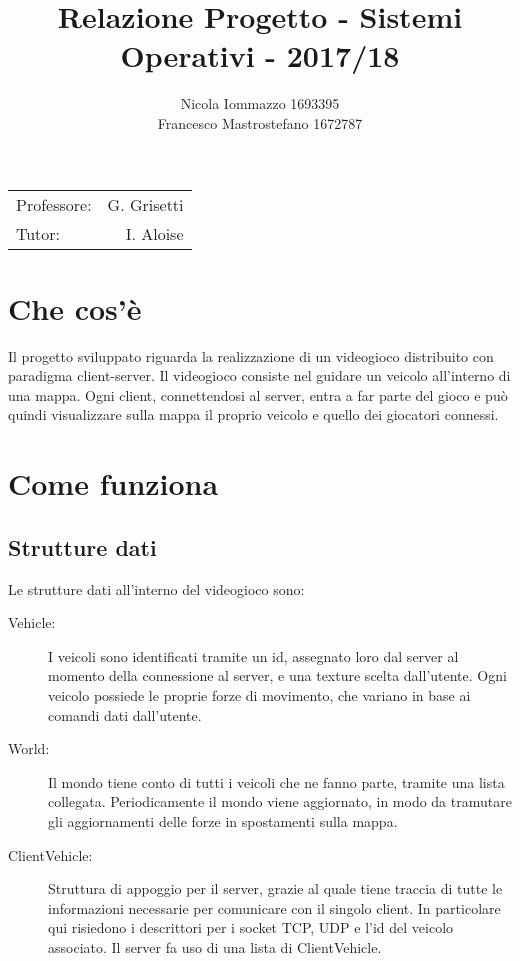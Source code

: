\documentclass{article}
\title{Relazione Progetto - Sistemi Operativi - 2017/18} %
\author{Nicola Iommazzo 1693395 \\ Francesco Mastrostefano 1672787} %
\date{}
\begin{document}
\maketitle %

\begin{center}
\begin{tabular}{l r}
Professore: & G. Grisetti \\		%
Tutor: & I. Aloise \\			
\end{tabular}
\end{center}

\section*{Che cos'è}
Il progetto sviluppato riguarda la realizzazione di un videogioco distribuito con paradigma client-server.
Il videogioco consiste nel guidare un veicolo all'interno di una mappa. Ogni client, connettendosi al server, entra a far parte del gioco e può quindi visualizzare sulla mappa il proprio veicolo e quello dei giocatori connessi.

\section*{Come funziona}

\subsection*{Strutture dati}
Le strutture dati all'interno del videogioco sono:
\begin{description}
\item[Vehicle:]
I veicoli sono identificati tramite un id, assegnato loro dal server al momento della connessione al server, e una texture scelta dall'utente. Ogni veicolo possiede le proprie forze di movimento, che variano in base ai comandi dati dall'utente. 
\item[World:]
Il mondo tiene conto di tutti i veicoli che ne fanno parte, tramite una lista collegata.
Periodicamente il mondo viene aggiornato, in modo da tramutare gli aggiornamenti delle forze in spostamenti sulla mappa.
\item[ClientVehicle:]
Struttura di appoggio per il server, grazie al quale tiene traccia di tutte le informazioni necessarie per comunicare con il singolo client. In particolare qui risiedono i descrittori per i socket TCP, UDP e l'id del veicolo associato. Il server fa uso di una lista di ClientVehicle.

\end{description}
\end{document}
